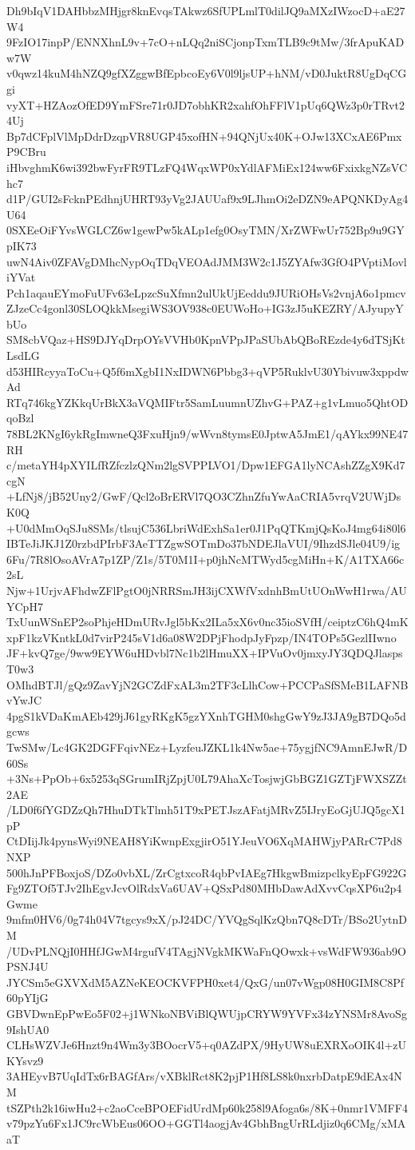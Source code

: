 Dh9bIqV1DAHbbzMHjgr8knEvqsTAkwz6SfUPLmlT0dilJQ9aMXzIWzocD+aE27W4
9FzIO17inpP/ENNXhnL9v+7cO+nLQq2niSCjonpTxmTLB9c9tMw/3frApuKADw7W
v0qwz14kuM4hNZQ9gfXZggwBfEpbcoEy6V0l9ljsUP+hNM/vD0JuktR8UgDqCGgi
vyXT+HZAozOfED9YmFSre71r0JD7obhKR2xahfOhFFlV1pUq6QWz3p0rTRvt24Uj
Bp7dCFplVlMpDdrDzqpVR8UGP45xofHN+94QNjUx40K+OJw13XCxAE6PmxP9CBru
iHbvghmK6wi392bwFyrFR9TLzFQ4WqxWP0xYdlAFMiEx124ww6FxixkgNZsVChc7
d1P/GUI2sFcknPEdhnjUHRT93yVg2JAUUaf9x9LJhmOi2eDZN9eAPQNKDyAg4U64
0SXEeOiFYvsWGLCZ6w1gewPw5kALp1efg0OsyTMN/XrZWFwUr752Bp9u9GYpIK73
uwN4Aiv0ZFAVgDMhcNypOqTDqVEOAdJMM3W2c1J5ZYAfw3GfO4PVptiMovliYVat
Pch1aqauEYmoFuUFv63eLpzcSuXfmn2ulUkUjEeddu9JURiOHsVs2vnjA6o1pmcv
ZJzeCc4gonl30SLOQkkMsegiWS3OV938c0EUWoHo+IG3zJ5uKEZRY/AJyupyYbUo
SM8cbVQaz+HS9DJYqDrpOYsVVHb0KpnVPpJPaSUbAbQBoREzde4y6dTSjKtLsdLG
d53HIRcyyaToCu+Q5f6mXgbI1NxIDWN6Pbbg3+qVP5RuklvU30Ybivuw3xppdwAd
RTq746kgYZKkqUrBkX3aVQMIFtr5SamLuumnUZhvG+PAZ+g1vLmuo5QhtODqoBzl
78BL2KNgI6ykRgImwneQ3FxuHjn9/wWvn8tymsE0JptwA5JmE1/qAYkx99NE47RH
c/metaYH4pXYILfRZfczlzQNm2lgSVPPLVO1/Dpw1EFGA1lyNCAshZZgX9Kd7cgN
+LfNj8/jB52Uny2/GwF/Qcl2oBrERVl7QO3CZhnZfuYwAaCRIA5vrqV2UWjDsK0Q
+U0dMmOqSJu8SMs/tlsujC536LbriWdExhSa1er0J1PqQTKmjQsKoJ4mg64i80l6
IBTeJiJKJ1Z0rzbdPIrbF3AeTTZgwSOTmDo37bNDEJlaVUI/9IhzdSJle04U9/ig
6Fu/7R8lOsoAVrA7p1ZP/Z1s/5T0M1I+p0jhNcMTWyd5cgMiHn+K/A1TXA66c2sL
Njw+1UrjvAFhdwZFlPgtO0jNRRSmJH3ijCXWfVxdnhBmUtUOnWwH1rwa/AUYCpH7
TxUunWSnEP2soPhjeHDmURvJgl5bKx2ILa5xX6v0nc35ioSVfH/ceiptzC6hQ4mK
xpF1kzVKntkL0d7virP245sV1d6a08W2DPjFhodpJyFpzp/IN4TOPs5GezlIIwno
JF+kvQ7ge/9ww9EYW6uHDvbl7Nc1b2lHmuXX+IPVuOv0jmxyJY3QDQJlaspsT0w3
OMhdBTJl/gQz9ZavYjN2GCZdFxAL3m2TF3cLlhCow+PCCPaSfSMeB1LAFNBvYwJC
4pgS1kVDaKmAEb429jJ61gyRKgK5gzYXnhTGHM0shgGwY9zJ3JA9gB7DQo5dgcws
TwSMw/Lc4GK2DGFFqivNEz+LyzfeuJZKL1k4Nw5ae+75ygjfNC9AmnEJwR/D60Ss
+3Ns+PpOb+6x5253qSGrumIRjZpjU0L79AhaXcTosjwjGbBGZ1GZTjFWXSZZt2AE
/LD0f6fYGDZzQh7HhuDTkTlmh51T9xPETJszAFatjMRvZ5IJryEoGjUJQ5gcX1pP
CtDIijJk4pynsWyi9NEAH8YiKwnpExgjirO51YJeuVO6XqMAHWjyPARrC7Pd8NXP
500hJnPFBoxjoS/DZo0vbXL/ZrCgtxcoR4qbPvIAEg7HkgwBmizpclkyEpFG922G
Fg9ZTOf5TJv2IhEgvJcvOlRdxVa6UAV+QSxPd80MHbDawAdXvvCqsXP6u2p4Gwme
9mfm0HV6/0g74h04V7tgcys9xX/pJ24DC/YVQgSqlKzQbn7Q8cDTr/BSo2UytnDM
/UDvPLNQjI0HHfJGwM4rgufV4TAgjNVgkMKWaFnQOwxk+vsWdFW936ab9OPSNJ4U
JYCSm5eGXVXdM5AZNeKEOCKVFPH0xet4/QxG/un07vWgp08H0GIM8C8Pf60pYIjG
GBVDwnEpPwEo5F02+j1WNkoNBViBlQWUjpCRYW9YVFx34zYNSMr8AvoSg9IshUA0
CLHsWZVJe6Hnzt9n4Wm3y3BOocrV5+q0AZdPX/9HyUW8uEXRXoOIK4l+zUKYsvz9
3AHEyvB7UqIdTx6rBAGfArs/vXBklRct8K2pjP1Hf8LS8k0nxrbDatpE9dEAx4NM
tSZPth2k16iwHu2+c2aoCceBPOEFidUrdMp60k258l9Afoga6s/8K+0nmr1VMFF4
v79pzYu6Fx1JC9rcWbEus06OO+GGTl4aogjAv4GbhBngUrRLdjiz0q6CMg/xMAaT
